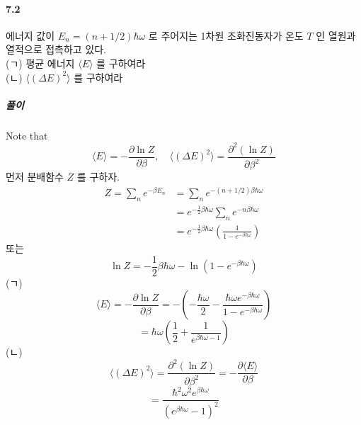 \documentclass[a4paper,12pt]{report}
\begin{document}
	\paragraph{7.2 } 에너지 값이 $E_n=(n+1/2)\hbar \omega$ 로 주어지는 1차원 조화진동자가 온도 $T$ 인 열원과 열적으로 접촉하고 있다.\\
	(ㄱ) 평균 에너지 $\langle E\rangle$ 를 구하여라\\
	(ㄴ) $\langle (\Delta E)^2 \rangle$ 를 구하여라
	\subparagraph{풀이} Note that
	$$\langle E\rangle=-\frac{\partial \ln Z}{\partial \beta},\quad \langle (\Delta E)^2 \rangle=\frac{\partial^2(\ln Z)}{\partial \beta^2}$$
	먼저 분배함수 $Z$ 를 구하자.
	\begin{equation*}
		\begin{split}
			Z=\sum_{n}e^{-\beta E_n}&=\sum_{n}e^{-(n+1/2)\beta\hbar\omega}\\
			&=e^{-\frac{1}{2}\beta\hbar\omega}\sum_{n}e^{-n\beta\hbar\omega}\\
			&=e^{-\frac{1}{2}\beta\hbar\omega}\left(\frac{1}{1-e^{-\beta\hbar\omega}} \right) 
		\end{split}
	\end{equation*}
	 또는
	$$\ln Z=-\frac{1}{2}\beta\hbar\omega-\ln(1-e^{-\beta\hbar\omega})$$
	(ㄱ) 
	$$\langle E\rangle=-\frac{\partial \ln Z}{\partial \beta}=-\left(-\frac{\hbar\omega}{2}-\frac{\hbar\omega e^{-\beta\hbar\omega}}{1-e^{-\beta\hbar\omega}} \right) $$
	$$=\hbar\omega\left(\frac{1}{2}+\frac{1}{e^{\beta\hbar\omega-1}} \right) $$
	(ㄴ)
	$$\langle (\Delta E)^2 \rangle=\frac{\partial^2(\ln Z)}{\partial \beta^2}=-\frac{\partial \langle E\rangle}{\partial \beta}$$
	$$=\frac{\hbar^2\omega^2e^{\beta\hbar\omega}}{(e^{\beta\hbar\omega}-1)^2}$$
\end{document}
